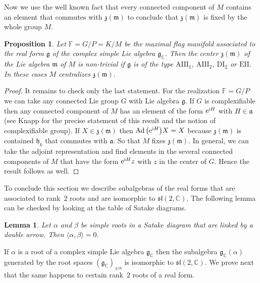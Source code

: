 \documentclass[pdftex]{sigma}
\numberwithin{equation}{section}
\newtheorem{Lemma}[Theorem]{Lemma}
\newtheorem{Proposition}[Theorem]{Proposition}
 { \theoremstyle{definition}
\newtheorem{Definition}[Theorem]{Definition}
\newtheorem{Note}[Theorem]{Note}
\newtheorem{Example}[Theorem]{Example}
\newtheorem{Remark}[Theorem]{Remark} }
\begin{document}
Now we use the well known fact that every connected component of $M$ contains an element that commutes with $\mathfrak{z} ( \mathfrak{m} ) $ to conclude that $\mathfrak{z}(\mathfrak{m}) $ is fixed by the whole group $M$.

\begin{Proposition}Let $\mathbb{F}=G/P=K/M$ be the maximal flag manifold associated to the real form $\mathfrak{g}$ of the complex simple Lie algebra $\mathfrak{g}_{\mathbb{C}}$. Then the center $\mathfrak{z}(\mathfrak{m}) $ of the Lie algebra $\mathfrak{m}$ of $M$ is non-trivial if $\mathfrak{g}$ is of the type $\mathrm{AIII}_{1}$, $\mathrm{AIII}_{2}$, $\mathrm{DI}_{2}$ or $\mathrm{EII}$. In these cases $M$ centralizes $\mathfrak{z}(\mathfrak{m}) $.
\end{Proposition}

\begin{proof}It remains to check only the last statement. For the realization $\mathbb{F}=G/P$ we can take any connected Lie group $G$ with Lie algebra $\mathfrak{g}$. If $G$ is complexifiable then any connected component of $M$ has an element of the form ${\rm e}^{{\rm i}H}$ with $H\in \mathfrak{a}$ (see Knapp \cite[Section~VII.5]{knapp} for the precise statement of this result and the notion of complexifiable group). If $X\in \mathfrak{z}(\mathfrak{m}) $ then $\operatorname{Ad} \big({\rm e}^{{\rm i}H} \big) X=X$ because $\mathfrak{z} (\mathfrak{m} ) $ is contained $\mathfrak{h}_{k}$ that commutes with $\mathfrak{a}$. So that $M$ fixes $\mathfrak{z}(\mathfrak{m}) $. In general, we can take the adjoint representation and find elements in the several connected components of $M$ that have the form ${\rm e}^{{\rm i}H}z$ with $z$ in the center of $G$. Hence the result follows as well.
\end{proof}

To conclude this section we describe subalgebras of the real forms that are associated to rank~$2$ roots and are isomorphic to $\mathfrak{sl}(2,\mathbb{C} ) $. The following lemma can be checked by looking at the
table of Satake diagrams.

\begin{Lemma}Let $\alpha $ and $\beta $ be simple roots in a Satake diagram that are linked by a double arrow. Then $\langle \alpha,\beta \rangle =0$.
\end{Lemma}

If $\mathbb{\alpha }$ is a root of a complex simple Lie algebra $\mathfrak{g}_{\mathbb{C}}$ then the subalgebra $\mathfrak{g}_{\mathbb{C}} (\alpha) $ generated by the root spaces $( \mathfrak{g}_{\mathbb{C}}) _{\pm \alpha }$ is isomorphic to $\mathfrak{sl}( 2,\mathbb{C}) $. We prove next that the same happens to certain rank~$2$ roots of a real form.
\end{document}
